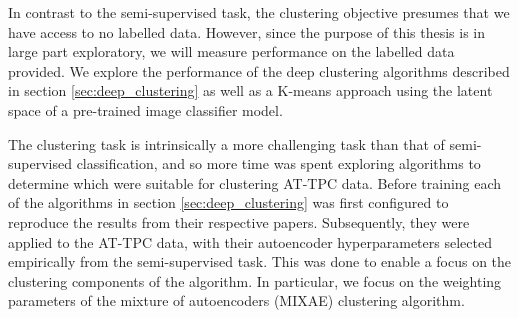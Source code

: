 In contrast to the semi-supervised task, the clustering objective presumes that we have access to no labelled data. However, since the purpose of this thesis is in large part exploratory, we will measure performance on the labelled data provided. We explore the performance of the deep clustering algorithms described in section \ref{sec:deep_clustering} as well as a K-means approach using the latent space of a pre-trained image classifier model. 

The clustering task is intrinsically a more challenging task than that of semi-supervised classification, and so more time was spent exploring algorithms to determine which were suitable for clustering AT-TPC data. Before training each of the algorithms in section \ref{sec:deep_clustering} was first configured to reproduce the results from their respective papers. Subsequently, they were applied to the AT-TPC data, with their autoencoder hyperparameters selected empirically from the semi-supervised task. This was done to enable a focus on the clustering components of the algorithm. In particular, we focus on the weighting parameters of the mixture of autoencoders (MIXAE) clustering algorithm.

